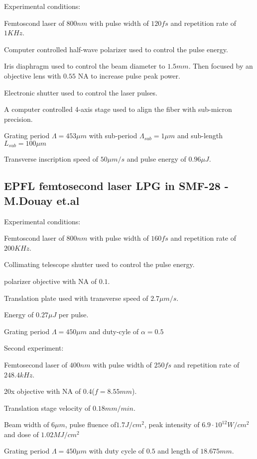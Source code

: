 \documentclass[11pt, openright]{book}
\begin{document}
    Experimental conditions:
      \begin{items}[-3pt]{-15pt}{-15pt}
          
         \item Femtoscond laser of $800nm$ with pulse width of $120fs$ and repetition rate of $1KHz$.
         \item Computer controlled half-wave polarizer used to control the pulse energy.
         \item Iris diaphragm used to control the beam diameter to $1.5mm$. Then focused by an objective lens with $0.55$ NA to increase pulse peak power.
         \item Electronic shutter used to control the laser pulses.
         \item A computer controlled 4-axis stage used to align the fiber with sub-micron precision.
         \item Grating period $\Lambda=453\mu m$ with sub-period $\Lambda_{sub}=1\mu m$ and sub-length $L_{sub}=100\mu m$
         \item Transverse inscription speed of $50\mu m/s$ and pulse energy of $0.96\mu J$.
     \end{items}

      \subsection*{EPFL femtosecond laser LPG in SMF-28 - M.Douay et.al}

        Experimental conditions:
         \begin{items}[-3pt]{-15pt}{-15pt}
            \item Femtoscond laser of $800nm$ with pulse width of $160fs$ and repetition rate of $200KHz$.
            \item Collimating telescope shutter used to control the pulse energy.
            \item polarizer objective with NA of $0.1$.
            \item Translation plate used with transverse speed of $2.7\mu m/s$.
            \item Energy of $0.27\mu J$ per pulse.
            \item Grating period $\Lambda=450\mu m$ and duty-cyle of $\alpha=0.5$
        \end{items}

        Second experiment:
         \begin{items}[-3pt]{-15pt}{-15pt}
            \item Femtosecond laser of $400nm$ with pulse width of $250fs$ and repetition rate of $248.4 kHz$.
            \item 20x objective with NA of $0.4$($f=8.55mm$).
            \item Translation stage velocity of $0.18mm/min$. 
            \item Beam width of $6\mu m$, pulse fluence of$1.7J/cm^2$, peak intensity of $6.9\cdot10^{12}W/cm^2$ and dose of $1.02MJ/cm^2$ 
            \item Grating period $\Lambda=450\mu m$ with duty cycle of $0.5$ and length of $18.675mm$.  
        \end{items}
       
\end{document}

